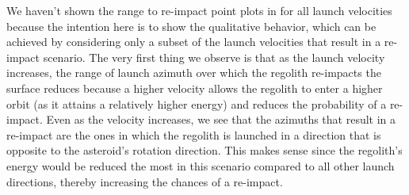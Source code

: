 We haven't shown the range to re-impact point plots in  for all launch velocities because the intention here is to show the qualitative behavior, which can be achieved by considering only a subset of the launch velocities that result in a re-impact scenario. The very first thing we observe is that as the launch velocity increases, the range of launch azimuth over which the regolith re-impacts the surface reduces because a higher velocity allows the regolith to enter a higher orbit (as it attains a relatively higher energy) and reduces the probability of a re-impact. Even as the velocity increases, we see that the azimuths that result in a re-impact are the ones in which the regolith is launched in a direction that is opposite to the asteroid's rotation direction. This makes sense since the regolith's energy would be reduced the most in this scenario compared to all other launch directions, thereby increasing the chances of a re-impact.
%
\newline\newline
%
